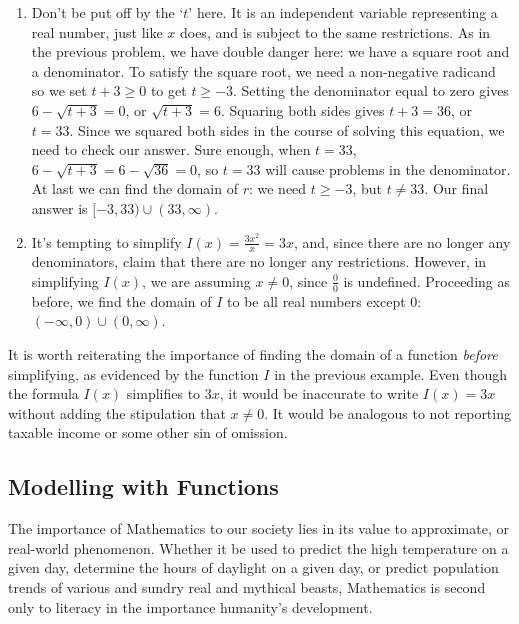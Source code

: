 {\begin{enumerate}
\item    Don't be put off by the `$t$' here. It is an independent variable representing a real number, just like $x$ does, and is subject to the same restrictions.  As in the previous problem, we have double danger here:  we have a square root and a denominator.   To satisfy the square root, we need a non-negative radicand so we set $t + 3 \geq 0$ to get $t \geq -3$.  Setting the denominator equal to zero gives $6 - \sqrt{t+3} =0$, or $\sqrt{t+3} = 6$.  Squaring both sides gives $t+3 = 36$, or $t = 33$. Since we squared both sides in the course of solving this equation, we need to check our answer.  Sure enough, when $t=33$, $6 - \sqrt{t+3} = 6 - \sqrt{36} = 0$, so $t=33$ will cause problems in the denominator.  At last we can find the domain of $r$:  we need $t \geq -3$, but $t \neq 33$.  Our final answer is  $[-3, 33) \cup (33, \infty)$.


\item  It's tempting to simplify $I(x) = \frac{3x^2}{x} = 3x$, and, since there are no longer any denominators, claim that there are no longer any restrictions.  However, in simplifying $I(x)$, we are assuming $x \neq 0$, since $\frac{0}{0}$ is undefined. Proceeding as before, we find the domain of $I$ to be all real numbers except $0$:  $(-\infty, 0) \cup (0, \infty)$.  
\end{enumerate}
}

\medskip

It is worth reiterating the importance of finding the domain of a function \emph{before} simplifying, as evidenced by the function $I$ in the previous example.  Even though the formula $I(x)$ simplifies to $3x$, it would be inaccurate to write $I(x) = 3x$ without adding the stipulation that $x \neq 0$. It would be analogous to not reporting taxable income or some other sin of omission.

\subsection{Modelling with Functions} \label{modeling}

The importance of Mathematics to our society lies in its value to approximate, or  real-world phenomenon.  Whether it be used to predict the high temperature on a given day, determine the hours of daylight on a given day, or predict population trends of various and sundry real and mythical beasts, Mathematics is second only to literacy in the importance humanity's development.

